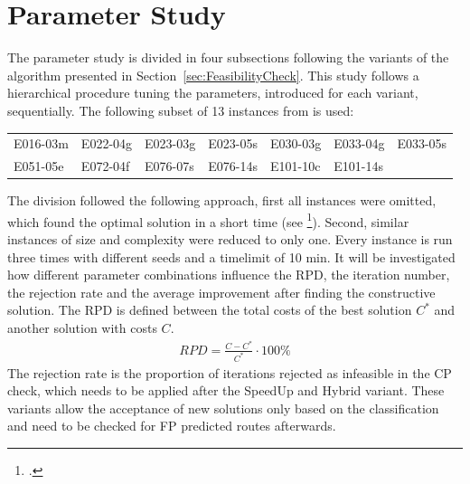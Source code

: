 \section{Parameter Study}
\label{sec:parameter_study}

The parameter study is divided in four subsections following the variants of the algorithm
presented in Section~\ref{sec:FeasibilityCheck}. This study follows a hierarchical procedure
tuning the parameters, introduced for each variant, sequentially. The following subset of 13
instances from \gendreauDataSetText is used:


\begin{table}[ht]
    \centering
    \setlength{\tabcolsep}{0.75em}
    \def\arraystretch{1.5}
    \begin{tabular}{lllllll}
        E016-03m & E022-04g & E023-03g & E023-05s & E030-03g & E033-04g & E033-05s \\
        E051-05e & E072-04f & E076-07s & E076-14s & E101-10c & E101-14s &          \\
    \end{tabular}
\end{table}

The division followed the following approach, first all instances were omitted, which found
the optimal solution in a short time (see \cite{tamke_branch-and-cut_2024}\footcite[cf.][p. 26]{tamke_branch-and-cut_2024}).
Second, similar instances of size and complexity were reduced to only one.
Every instance is run three times with different seeds and a timelimit of 10 min. It will be investigated
how different parameter combinations influence the \gls{RPD}, the iteration number, the rejection rate and
the average improvement after finding the constructive solution. The \gls{RPD} is defined between the
total costs of the best solution $C^*$ and another solution with costs $C$.
\begin{align}
    RPD = \frac{C - C^*}{C^*} \cdot 100\%
\end{align}
The rejection rate is the proportion of iterations rejected as infeasible in the \gls{CP} check, which needs
to be applied after the SpeedUp and Hybrid  variant. These variants allow the acceptance of
new solutions only based on the classification and need to be checked for \gls{FP} predicted routes afterwards.

